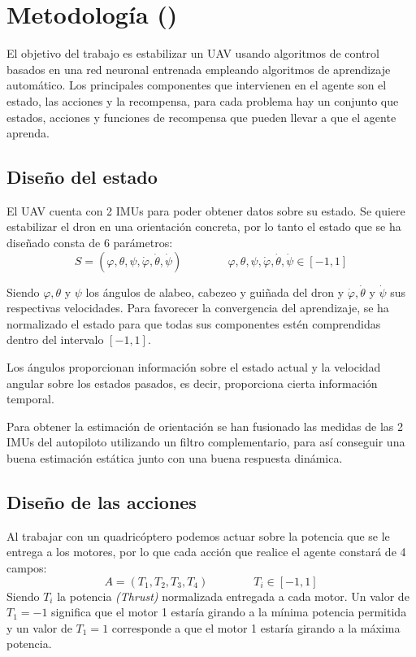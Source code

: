 \chapter{Metodología ()}
El objetivo del trabajo es estabilizar un UAV usando algoritmos de control basados en una red neuronal entrenada empleando algoritmos de aprendizaje automático. Los principales componentes que intervienen en el agente son el estado, las acciones y la recompensa, para cada problema hay un conjunto que estados, acciones y funciones de recompensa que pueden llevar a que el agente aprenda.

\section{Diseño del estado}
 El UAV cuenta con 2 IMUs para poder obtener datos sobre su estado. Se quiere estabilizar el dron en una orientación concreta, por lo tanto el estado que se ha diseñado consta de 6 parámetros:
\begin{equation}
	S=(\varphi,\theta,\psi,\dot\varphi,\dot\theta,\dot\psi) \qquad\qquad \varphi,\theta,\psi,\dot\varphi,\dot\theta,\dot\psi \in [-1,1]
\end{equation} 

Siendo $\varphi,\theta$ y $\psi$ los ángulos de alabeo, cabezeo y guiñada del dron  y $\dot\varphi,\dot\theta$ y $\dot\psi$ sus respectivas velocidades. Para favorecer la convergencia del aprendizaje, se ha normalizado el estado para que todas sus componentes estén comprendidas dentro del intervalo $[-1,1]$.

Los ángulos proporcionan información sobre el estado actual y la velocidad angular sobre los estados pasados, es decir, proporciona cierta información temporal. 

Para obtener la estimación de orientación se han fusionado las medidas de las 2 IMUs del autopiloto utilizando un filtro complementario, para así conseguir una buena estimación estática junto con una buena respuesta dinámica.
\section{Diseño de las acciones}
Al trabajar con un quadricóptero podemos actuar sobre la potencia que se le entrega a los motores, por lo que cada acción que realice el agente constará de 4 campos:
\begin{equation}
	A = (T_1,T_2,T_3,T_4) \qquad\qquad T_i \in [-1,1]
\end{equation}
Siendo $T_i$ la potencia \textit{(Thrust)} normalizada entregada a cada motor. Un valor de $T_1=-1$ significa que el motor 1 estaría girando a la mínima potencia permitida y un valor de $T_1=1$ corresponde a que el motor 1 estaría girando a la máxima potencia.\\

